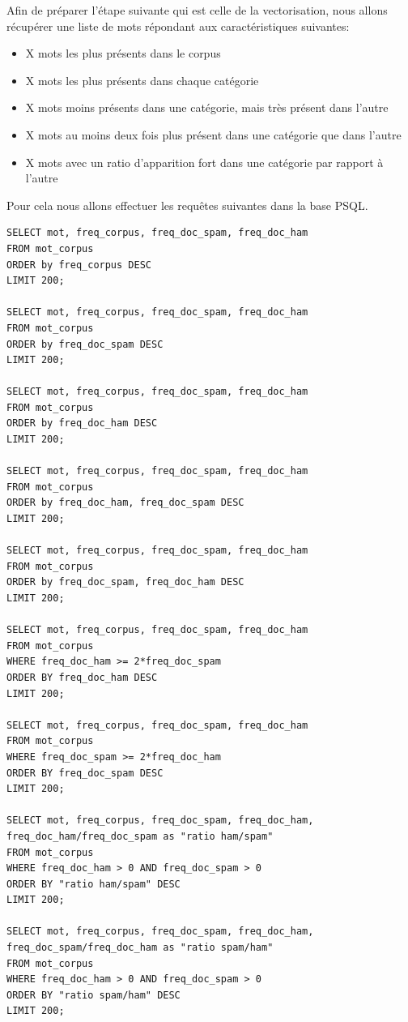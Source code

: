 \documentclass[a4paper,12pt]{article}
\begin{document}
			Afin de préparer l'étape suivante qui est celle de la vectorisation, nous allons récupérer une liste de mots répondant aux caractéristiques suivantes:
			\begin{itemize}
				\item X mots les plus présents dans le corpus
				\item X mots les plus présents dans chaque catégorie
				\item X mots moins présents dans une catégorie, mais très présent dans l'autre
				\item X mots au moins deux fois plus présent dans une catégorie que dans l'autre
				\item X mots avec un ratio d'apparition fort dans une catégorie par rapport à l'autre
			\end{itemize}
			Pour cela nous allons effectuer les requêtes suivantes dans la base PSQL.
			\begin{verbatim}
SELECT mot, freq_corpus, freq_doc_spam, freq_doc_ham 
FROM mot_corpus
ORDER by freq_corpus DESC
LIMIT 200;

SELECT mot, freq_corpus, freq_doc_spam, freq_doc_ham 
FROM mot_corpus
ORDER by freq_doc_spam DESC
LIMIT 200;

SELECT mot, freq_corpus, freq_doc_spam, freq_doc_ham 
FROM mot_corpus
ORDER by freq_doc_ham DESC
LIMIT 200;

SELECT mot, freq_corpus, freq_doc_spam, freq_doc_ham 
FROM mot_corpus
ORDER by freq_doc_ham, freq_doc_spam DESC
LIMIT 200;

SELECT mot, freq_corpus, freq_doc_spam, freq_doc_ham 
FROM mot_corpus
ORDER by freq_doc_spam, freq_doc_ham DESC
LIMIT 200;

SELECT mot, freq_corpus, freq_doc_spam, freq_doc_ham
FROM mot_corpus
WHERE freq_doc_ham >= 2*freq_doc_spam
ORDER BY freq_doc_ham DESC
LIMIT 200;

SELECT mot, freq_corpus, freq_doc_spam, freq_doc_ham
FROM mot_corpus
WHERE freq_doc_spam >= 2*freq_doc_ham
ORDER BY freq_doc_spam DESC
LIMIT 200;

SELECT mot, freq_corpus, freq_doc_spam, freq_doc_ham, 
freq_doc_ham/freq_doc_spam as "ratio ham/spam"
FROM mot_corpus
WHERE freq_doc_ham > 0 AND freq_doc_spam > 0
ORDER BY "ratio ham/spam" DESC
LIMIT 200;

SELECT mot, freq_corpus, freq_doc_spam, freq_doc_ham, 
freq_doc_spam/freq_doc_ham as "ratio spam/ham"
FROM mot_corpus
WHERE freq_doc_ham > 0 AND freq_doc_spam > 0
ORDER BY "ratio spam/ham" DESC
LIMIT 200;
			\end{verbatim}
			
\end{document}
